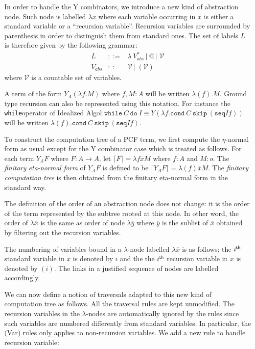 \documentclass{article}
\newcommand{\aux}[1]{\lceil #1\rceil}
\newcommand{\syneq}{\equiv}
\newcommand\iaseq{\texttt{seq}}
\newcommand\iaskip{\texttt{skip}}
\newcommand\iawhile{\texttt{while}}
\newcommand\iado{\texttt{do}}
\newcommand\pcfcond{\texttt{cond}}
\begin{document}
In order to handle the Y combinators, we introduce a new kind of abstraction node. Such node is labelled $\lambda \overline{x}$ where each variable occurring in $\overline{x}$ is either a standard variable or a ``recursion variable''.
Recursion variables are surrounded by parenthesis in order to distinguish them from standard ones. The set of labels $L$ is therefore given by the following grammar:
\begin{eqnarray*}
L &::=& \lambda\ V_{abs}^*\ |\ @\ |\ \mathcal{V} \\
V_{abs} &::=& \mathcal{V}\ |\ (\mathcal{V})
\end{eqnarray*}
where $\mathcal{V}$ is a countable set of variables.


A term of the form $Y_A (\lambda f. M)$ where $f,M:A$ will be written  $\lambda (f) . M$. Ground type recursion can also be represented using this notation. For instance the \iawhile operator of Idealized Algol
$\iawhile\ C\ \iado\ I \syneq Y( \lambda f. \pcfcond\ C\ \iaskip\ (\iaseq I f))$ will be written $\lambda (f) . \pcfcond\ C\ \iaskip\ (\iaseq I f)$.


To construct the computation tree of a PCF term, we first compute the $\eta$-normal form as usual except for the Y combinator case which is treated as follows.
For each term $Y_A F$ where $F:A\rightarrow A$, let  $\aux{F} = \lambda f \overline{x} M$ where $f:A$ and $M:o$. The \emph{finitary eta-normal form} of $Y_A F$ is defined to be
$\aux{Y_A F} = \lambda (f) \overline{x} M$.
The \emph{finitary computation tree} is then obtained from the finitary eta-normal form in the standard way.

The definition of the  order of an abstraction node does not change:
it is the order of the term represented by the subtree rooted at
this node. In other word, the order of $\lambda \overline{x}$ is the
same as order of node $\lambda \overline{y}$ where $\overline{y}$ is
the sublist of $\overline{x}$  obtained by filtering out the
recursion variables.

The numbering of variables bound in a $\lambda$-node labelled $\lambda \overline{x}$ is as follows: the $i^{\sf th}$ standard variable in $\overline{x}$ is denoted by $i$ and the
the $i^{\sf th}$ recursion variable in $\overline{x}$
is denoted by $(i)$. The links in a justified sequence of nodes are labelled accordingly.

We can now define a notion of traversals adapted to this new kind of computation tree as follows. All the traversal rules are kept unmodified. The recursion variables in the $\lambda$-nodes are automatically ignored by the rules since such variables are numbered differently from standard variables. In particular, the (Var) rules only applies to non-recursion variables.
We add a new rule to handle recursion variable:
\end{document}
